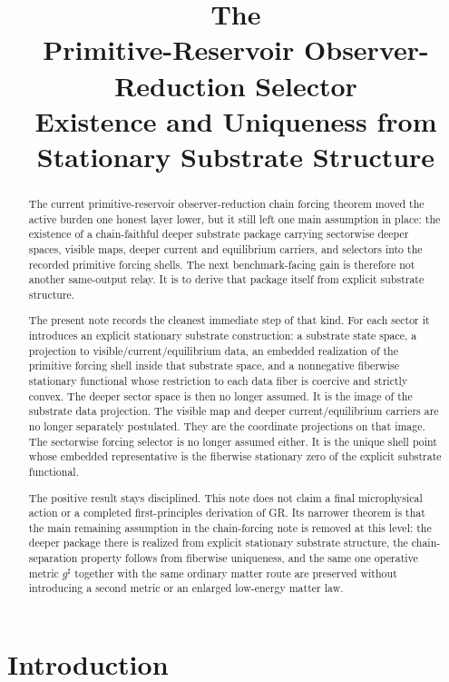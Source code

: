 \documentclass[11pt]{article}
\title{\textbf{The \TheoryName{}}\\[0.4em]
\large Primitive-Reservoir Observer-Reduction Selector\\
\large Existence and Uniqueness from Stationary Substrate Structure}
\author{}
\date{}
\newcommand{\CompletedMetric}{g^{\sharp}}
\begin{document}
\maketitle

\begin{abstract}
The current primitive-reservoir observer-reduction chain forcing theorem moved the active burden one honest layer lower, but it still left one main assumption in place: the existence of a chain-faithful deeper substrate package carrying sectorwise deeper spaces, visible maps, deeper current and equilibrium carriers, and selectors into the recorded primitive forcing shells. The next benchmark-facing gain is therefore not another same-output relay. It is to derive that package itself from explicit substrate structure.

The present note records the cleanest immediate step of that kind. For each sector it introduces an explicit stationary substrate construction: a substrate state space, a projection to visible/current/equilibrium data, an embedded realization of the primitive forcing shell inside that substrate space, and a nonnegative fiberwise stationary functional whose restriction to each data fiber is coercive and strictly convex. The deeper sector space is then no longer assumed. It is the image of the substrate data projection. The visible map and deeper current/equilibrium carriers are no longer separately postulated. They are the coordinate projections on that image. The sectorwise forcing selector is no longer assumed either. It is the unique shell point whose embedded representative is the fiberwise stationary zero of the explicit substrate functional.

The positive result stays disciplined. This note does not claim a final microphysical action or a completed first-principles derivation of GR. Its narrower theorem is that the main remaining assumption in the chain-forcing note is removed at this level: the deeper package there is realized from explicit stationary substrate structure, the chain-separation property follows from fiberwise uniqueness, and the same one operative metric \(\CompletedMetric\) together with the same ordinary matter route are preserved without introducing a second metric or an enlarged low-energy matter law.
\end{abstract}

\section{Introduction}
\end{document}
